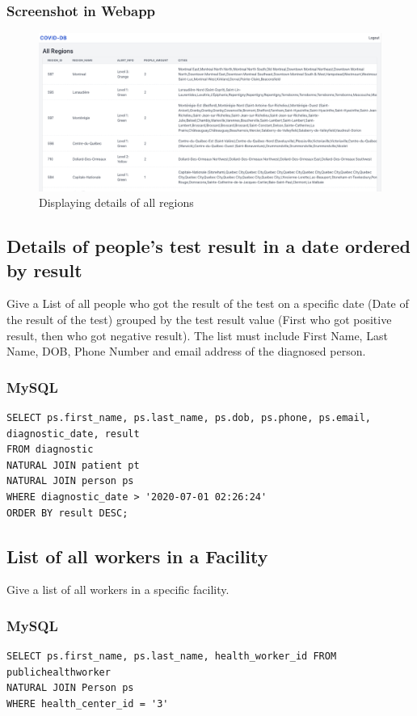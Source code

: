\subsubsection{Screenshot in Webapp}

\begin{figure}[H]
    \centering
    \includegraphics[scale=0.25]{imgs/allregions.png}
    \caption{Displaying details of all regions}
\end{figure}

\subsection{Details of people's test result in a date ordered by result}
Give a List of all people who got the result of the test on a specific date
(Date of the result of the test) grouped by the test result value (First who got
positive result, then who got negative result). The list must include First
Name, Last Name, DOB, Phone Number and email address of the diagnosed
person. 

\subsubsection{MySQL}
\begin{verbatim}
SELECT ps.first_name, ps.last_name, ps.dob, ps.phone, ps.email, diagnostic_date, result
FROM diagnostic
NATURAL JOIN patient pt
NATURAL JOIN person ps
WHERE diagnostic_date > '2020-07-01 02:26:24'
ORDER BY result DESC;
\end{verbatim}

\subsection{List of all workers in a Facility}
Give a list of all workers in a specific facility. 

\subsubsection{MySQL}
\begin{verbatim}
SELECT ps.first_name, ps.last_name, health_worker_id FROM publichealthworker
NATURAL JOIN Person ps
WHERE health_center_id = '3'
\end{verbatim}

